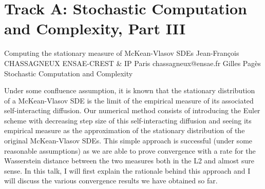 \section{Track A: Stochastic Computation and Complexity, Part III}\newpage

\begin{talk}
  {Computing the stationary measure of McKean-Vlasov SDEs}%
  {Jean-Fran\c{c}ois CHASSAGNEUX}%
  {ENSAE-CREST \& IP Paris}%
  {chassagneux@ensae.fr}%
  {Gilles Pag\`es}%
  {Stochastic Computation and Complexity}%
    
   
Under some confluence assumption, it is known that the stationary distribution of a McKean-Vlasov SDE is the limit of the empirical measure of its associated self-interacting diffusion. 
Our numerical method consists of introducing the Euler scheme with decreasing step size of this self-interacting diffusion and seeing its empirical measure as the approximation of the stationary distribution of the original McKean-Vlasov SDEs.
This simple approach is successful (under some reasonable assumptions) as we are able to prove convergence with a rate for the Wasserstein distance between the two measures both in the L2 and almost sure sense. In this talk, I will first explain the rationale behind this approach and  I will discuss the various convergence results we have obtained so far.





\end{talk}

